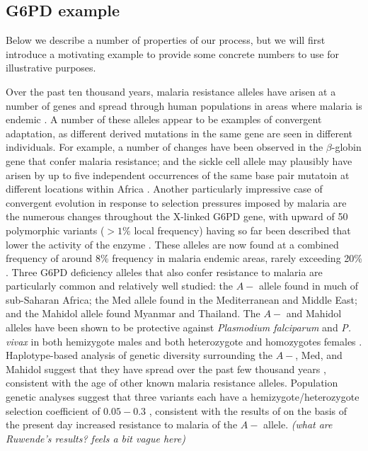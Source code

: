 \documentclass{article}
\newcommand{\plr}[1]{{\it\color{blue}(#1)}}
\begin{document}
\subsection{G6PD example}

Below we describe a number of properties of our process, but we will first introduce 
a motivating example to provide some concrete
numbers to use for illustrative purposes.

Over the past ten thousand years, malaria resistance alleles have arisen at a number of genes 
and spread through human populations in areas where malaria is endemic \citep{Kwiatkowski:05}. 
A number of these alleles appear to be examples of convergent adaptation, 
as different derived mutations in the same gene are seen in different individuals.
For example, 
a number of changes have been observed in the $\beta$-globin gene that confer malaria resistance;
and the sickle cell allele may plausibly have arisen by up to five independent occurrences
of the same base pair mutatoin at different locations within Africa
\citep{Flint:98,ralph2010parallel}.
Another particularly impressive case of convergent evolution in response to
selection pressures imposed by malaria are the numerous changes throughout the X-linked G6PD gene, 
with upward of 50 polymorphic variants ($>1\%$ local frequency) having so far been described 
that lower the activity of the enzyme \citep{Howes-g6pd-variants,Minucci-g6pd}. 
These alleles are now found at a combined frequency of around 8\% frequency in malaria endemic areas,
rarely exceeding 20\% \citep{Howes-g6pd-preval}. 
Three G6PD deficiency alleles that also confer resistance to malaria 
are particularly common and relatively well studied: 
the $A-$ allele found in much of sub-Saharan Africa; 
the Med allele found in the Mediterranean and Middle East; 
and the Mahidol allele found Myanmar and Thailand.
The $A-$ and Mahidol alleles have been shown
to be protective against {\it Plasmodium falciparum} and {\it P. vivax} in both
hemizygote males and both heterozygote and homozygotes females \citep{Ruwende-g6pd, Louicharoen-g6pd}. 
Haplotype-based analysis of genetic diversity surrounding
the $A-$, Med, and Mahidol suggest that they have spread over the past 
few thousand years  \citet{tishkoff-g6pd,Slatkin-age-est,Saunders-g6pd,Louicharoen-g6pd}, 
consistent with the age of other known malaria resistance alleles. 
Population genetic analyses suggest that three variants each have a hemizygote/heterozygote 
selection coefficient of $0.05-0.3$ \citep{tishkoff-g6pd,Slatkin-age-est,Saunders-g6pd,Louicharoen-g6pd}, 
consistent with the results of \citet{Ruwende-g6pd} on the basis of the present day increased resistance to malaria of the $A-$ allele. 
\plr{what are Ruwende's results? feels a bit vague here} \\
\end{document}
